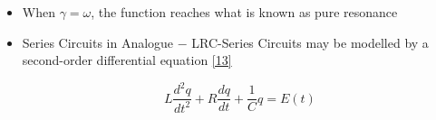 \documentclass[12pt]{article}
\begin{document}
\begin{itemize}
\item When $\gamma=\omega$, the function reaches what is known as pure resonance

\item Series Circuits in Analogue $-$ LRC-Series Circuits may be modelled by a second-order differential equation \eqref{13}

  \begin{equation}
    L\frac{d^2q}{dt^2}+R\frac{dq}{dt}+\frac{1}{C}q=E(t)
    \label{13}
  \end{equation}

\end{itemize}
\end{document}
